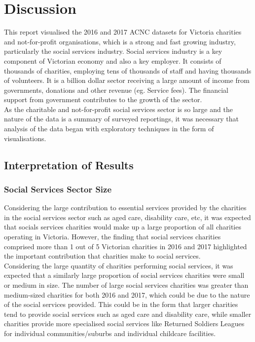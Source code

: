\documentclass[
  11pt,
]{article}
\begin{document}
\hypertarget{discussion}{%
\section{Discussion}\label{discussion}}

This report visualised the 2016 and 2017 ACNC datasets for Victoria charities and not-for-profit organisations, which is a strong and fast growing industry, particularly the social services industry. Social services industry is a key component of Victorian economy and also a key employer. It consists of thousands of charities, employing tens of thousands of staff and having thousands of volunteers. It is a billion dollar sector receiving a large amount of income from governments, donations and other revenue (eg. Service fees). The financial support from government contributes to the growth of the sector.\\
As the charitable and not-for-profit social services sector is so large and the nature of the data is a summary of surveyed reportings, it was necessary that analysis of the data began with exploratory techniques in the form of visualisations.

\hypertarget{interpretation-of-results}{%
\subsection{Interpretation of Results}\label{interpretation-of-results}}

\hypertarget{social-services-sector-size-1}{%
\subsubsection{Social Services Sector Size}\label{social-services-sector-size-1}}

Considering the large contribution to essential services provided by the charities in the social services sector such as aged care, disability care, etc, it was expected that socials services charities would make up a large proportion of all charities operating in Victoria. However, the finding that social services charities comprised more than 1 out of 5 Victorian charities in 2016 and 2017 highlighted the important contribution that charities make to social services.\\
Considering the large quantity of charities performing social services, it was expected that a similarly large proportion of social services charities were small or medium in size. The number of large social services charities was greater than medium-sized charities for both 2016 and 2017, which could be due to the nature of the social services provided. This could be in the form that larger charities tend to provide social services such as aged care and disability care, while smaller charities provide more specialised social services like Returned Soldiers Leagues for individual communities/suburbs and individual childcare facilities.
\end{document}
